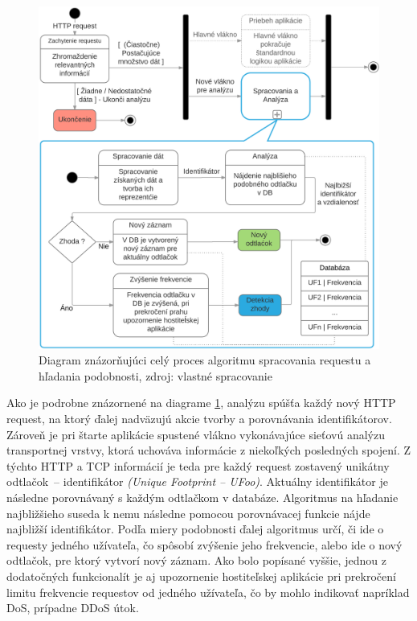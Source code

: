 \documentclass[
  printed, %
  table,   %
  lof,     %
  nolot,   %
  nocover
]{fithesis3}
\begin{document}
\begin{figure}[h]
  \centering
    \includegraphics[width=.93\textwidth]{images/footprint-hl.png}
  \caption{Diagram znázorňujúci celý proces algoritmu spracovania requestu a
  hľadania podobnosti, zdroj: vlastné spracovanie}
  \label{fig:footprint-hl}
\end{figure}

Ako je podrobne znázornené na diagrame \ref{fig:footprint-hl}, analýzu spúšťa každý nový
HTTP request, na ktorý ďalej nadväzujú akcie tvorby a porovnávania
identifikátorov. Zároveň je pri štarte aplikácie spustené vlákno vykonávajúce
sieťovú analýzu transportnej vrstvy, ktorá uchováva informácie z niekoľkých
posledných spojení. Z týchto HTTP a TCP informácií je teda pre každý request
zostavený unikátny odtlačok~-- identifikátor \textit{(Unique Footprint -- UFoo)}.
Aktuálny identifikátor je následne porovnávaný s každým odtlačkom v databáze.
Algoritmus na hľadanie najbližšieho suseda k nemu následne pomocou porovnávacej
funkcie nájde najbližší identifikátor. Podľa miery podobnosti ďalej
algoritmus určí, či ide o requesty jedného užívateľa, čo spôsobí zvýšenie jeho
frekvencie, alebo ide o nový odtlačok, pre ktorý vytvorí nový záznam.
Ako bolo popísané vyššie, jednou z dodatočných funkcionalít je aj upozornenie hostiteľskej aplikácie pri
prekročení limitu frekvencie requestov od jedného užívateľa, čo by mohlo
indikovať napríklad DoS, prípadne DDoS útok.
\end{document}
